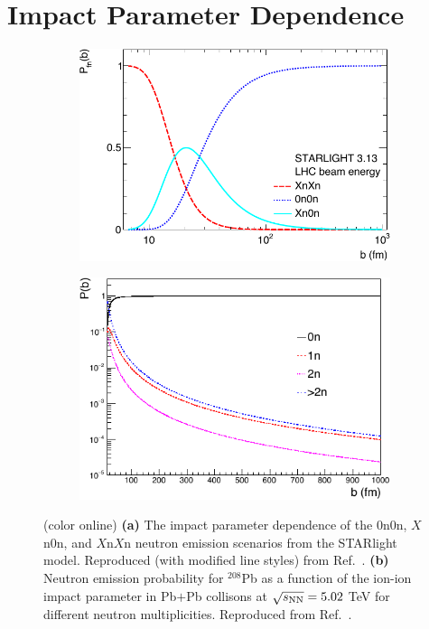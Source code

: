 \documentclass[twocolumn,epjc3]{svjour3}\sloppy
\begin{document}
\section{Impact Parameter Dependence}
\label{sec:impact}
\begin{figure}
    \centering
    \begin{subfigure}{.50\textwidth}
      \centering
      \includegraphics[width=.99\linewidth]{fig/fig_3-crop.pdf}
      \caption{}
    \end{subfigure}%
    \begin{subfigure}{.50\textwidth}
      \centering
      \includegraphics[width=.99\linewidth]{fig/fig_4-crop.pdf}
      \caption{}
    \end{subfigure}
    \caption{ (color online) \textbf{(a)} The impact parameter dependence of the $0$n$0$n, $X$n$0$n, and $X$n$X$n neutron emission scenarios from the STARlight model. Reproduced (with modified line styles) from Ref.~\cite{kleinPhotonuclearTwoPhotonInteractions2020}. \textbf{(b)} Neutron emission probability for $^{208}$Pb as a function of the ion-ion impact parameter in Pb$+$Pb collisons at $\sqrt{s_{\rm{NN}}} = 5.02$ TeV for different neutron multiplicities. Reproduced from Ref.~\cite{brandenburgAcoplanarityQEDPairs2020b}. 
    }
    \label{fig:neutron_theory}
\end{figure}
\end{document}
